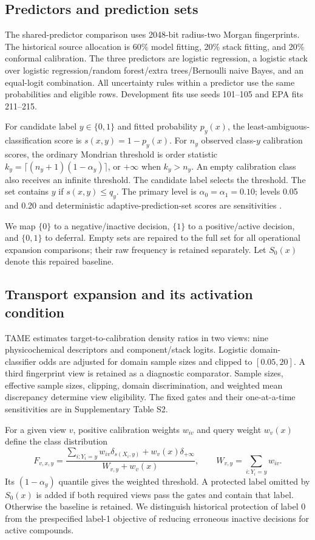 \subsection{Predictors and prediction sets}
The shared-predictor comparison uses 2048-bit radius-two Morgan fingerprints. The historical source allocation is 60\% model fitting, 20\% stack fitting, and 20\% conformal calibration. The three predictors are logistic regression, a logistic stack over logistic regression/random forest/extra trees/Bernoulli naive Bayes, and an equal-logit combination. All uncertainty rules within a predictor use the same probabilities and eligible rows. Development fits use seeds 101--105 and EPA fits 211--215.

For candidate label $y\in\{0,1\}$ and fitted probability $p_y(x)$, the least-ambiguous-classification score is $s(x,y)=1-p_y(x)$. For $n_y$ observed class-$y$ calibration scores, the ordinary Mondrian threshold is order statistic $k_y=\lceil(n_y+1)(1-\alpha_y)\rceil$, or $+\infty$ when $k_y>n_y$. An empty calibration class also receives an infinite threshold. The candidate label selects the threshold. The set contains $y$ if $s(x,y)\le q_y$. The primary level is $\alpha_0=\alpha_1=0.10$; levels 0.05 and 0.20 and deterministic adaptive-prediction-set scores are sensitivities \citep{romano2020}.

We map $\{0\}$ to a negative/inactive decision, $\{1\}$ to a positive/active decision, and $\{0,1\}$ to deferral. Empty sets are repaired to the full set for all operational expansion comparisons; their raw frequency is retained separately. Let $S_0(x)$ denote this repaired baseline.

\subsection{Transport expansion and its activation condition}
TAME estimates target-to-calibration density ratios in two views: nine physicochemical descriptors and component/stack logits. Logistic domain-classifier odds are adjusted for domain sample sizes and clipped to $[0.05,20]$. A third fingerprint view is retained as a diagnostic comparator. Sample sizes, effective sample sizes, clipping, domain discrimination, and weighted mean discrepancy determine view eligibility. The fixed gates and their one-at-a-time sensitivities are in Supplementary Table S2.

For a given view $v$, positive calibration weights $w_{iv}$ and query weight $w_v(x)$ define the class distribution
\begin{equation}
 F_{v,x,y}=\frac{\sum_{i:Y_i=y} w_{iv}\delta_{s(X_i,y)}+w_v(x)\delta_{+\infty}}{W_{v,y}+w_v(x)},
 \qquad W_{v,y}=\sum_{i:Y_i=y}w_{iv}.
\end{equation}
Its $(1-\alpha_y)$ quantile gives the weighted threshold. A protected label omitted by $S_0(x)$ is added if both required views pass the gates and contain that label. Otherwise the baseline is retained. We distinguish historical protection of label 0 from the prespecified label-1 objective of reducing erroneous inactive decisions for active compounds.


